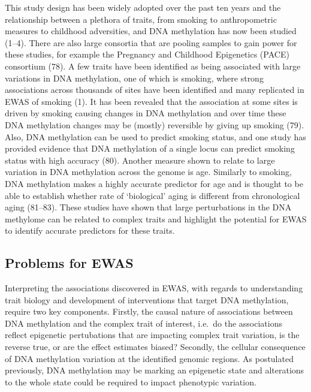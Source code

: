 \documentclass[11pt,oneside]{bristolthesis}
\begin{document}
This study design has been widely adopted over the past ten years and the relationship between a plethora of traits, from smoking to anthropometric measures to childhood adversities, and DNA methylation has now been studied (1--4). There are also large consortia that are pooling samples to gain power for these studies, for example the Pregnancy and Childhood Epigenetics (PACE) consortium (78). A few traits have been identified as being associated with large variations in DNA methylation, one of which is smoking, where strong associations across thousands of sites have been identified and many replicated in EWAS of smoking (1). It has been revealed that the association at some sites is driven by smoking causing changes in DNA methylation and over time these DNA methylation changes may be (mostly) reversible by giving up smoking (79). Also, DNA methylation can be used to predict smoking status, and one study has provided evidence that DNA methylation of a single locus can predict smoking status with high accuracy (80). Another measure shown to relate to large variation in DNA methylation across the genome is age. Similarly to smoking, DNA methylation makes a highly accurate predictor for age and is thought to be able to establish whether rate of `biological' aging is different from chronological aging (81--83). These studies have shown that large perturbations in the DNA methylome can be related to complex traits and highlight the potential for EWAS to identify accurate predictors for these traits.

\hypertarget{problems-for-ewas}{%
\subsection{Problems for EWAS}\label{problems-for-ewas}}

Interpreting the associations discovered in EWAS, with regards to understanding trait biology and development of interventions that target DNA methylation, require two key components. Firstly, the causal nature of associations between DNA methylation and the complex trait of interest, i.e.~do the associations reflect epigenetic pertubations that are impacting complex trait variation, is the reverse true, or are the effect estimates biased? Secondly, the cellular consequence of DNA methylation variation at the identified genomic regions. As postulated previously, DNA methylation may be marking an epigenetic state and alterations to the whole state could be required to impact phenotypic variation.
\end{document}
